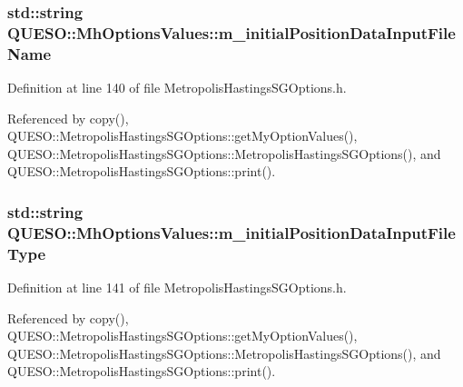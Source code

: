 \hypertarget{class_q_u_e_s_o_1_1_mh_options_values_a208c0eb1f88ee743b2710afb503c4b4d}{
\subsubsection[{m\-\_\-initial\-Position\-Data\-Input\-File\-Name}]{\setlength{\rightskip}{0pt plus 5cm}std\-::string Q\-U\-E\-S\-O\-::\-Mh\-Options\-Values\-::m\-\_\-initial\-Position\-Data\-Input\-File\-Name}}\label{class_q_u_e_s_o_1_1_mh_options_values_a208c0eb1f88ee743b2710afb503c4b4d}


Definition at line 140 of file Metropolis\-Hastings\-S\-G\-Options.\-h.



Referenced by copy(), Q\-U\-E\-S\-O\-::\-Metropolis\-Hastings\-S\-G\-Options\-::get\-My\-Option\-Values(), Q\-U\-E\-S\-O\-::\-Metropolis\-Hastings\-S\-G\-Options\-::\-Metropolis\-Hastings\-S\-G\-Options(), and Q\-U\-E\-S\-O\-::\-Metropolis\-Hastings\-S\-G\-Options\-::print().

\hypertarget{class_q_u_e_s_o_1_1_mh_options_values_ad5bdf1c0416c71aeef586e4c86b4d4be}{
\subsubsection[{m\-\_\-initial\-Position\-Data\-Input\-File\-Type}]{\setlength{\rightskip}{0pt plus 5cm}std\-::string Q\-U\-E\-S\-O\-::\-Mh\-Options\-Values\-::m\-\_\-initial\-Position\-Data\-Input\-File\-Type}}\label{class_q_u_e_s_o_1_1_mh_options_values_ad5bdf1c0416c71aeef586e4c86b4d4be}


Definition at line 141 of file Metropolis\-Hastings\-S\-G\-Options.\-h.



Referenced by copy(), Q\-U\-E\-S\-O\-::\-Metropolis\-Hastings\-S\-G\-Options\-::get\-My\-Option\-Values(), Q\-U\-E\-S\-O\-::\-Metropolis\-Hastings\-S\-G\-Options\-::\-Metropolis\-Hastings\-S\-G\-Options(), and Q\-U\-E\-S\-O\-::\-Metropolis\-Hastings\-S\-G\-Options\-::print().

